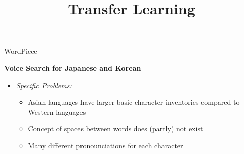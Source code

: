


\usepackage{colortbl}

\newcommand{\titlefigure}{figure/tokenize.png}
\newcommand{\learninggoals}{
\item Understand the importance of tokenization for Transfer Learning
\item Benefits of data driven tokenization over "generic" approaches}

\title{Transfer Learning}
\date{}




\begin{frame}{WordPiece}

\vfill

	\textbf{Voice Search for Japanese and Korean \href{https://storage.googleapis.com/pub-tools-public-publication-data/pdf/37842.pdf}{}}

	\begin{itemize}
		\item \textit{Specific Problems:} 
			\begin{itemize}
				\item Asian languages have larger basic character inventories compared to Western languages
				\item Concept of spaces between words does (partly) not exist
				\item Many different pronounciations for each character
			\end{itemize}
	\end{itemize}
	
\vfill

\end{frame}


